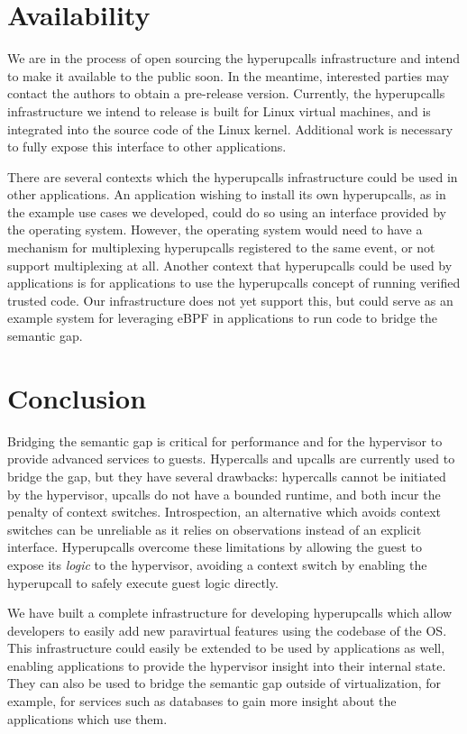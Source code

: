 \documentclass[11pt]{article}
\newcommand{\Hypercallback}{Hyperupcall\xspace{}}
\newcommand{\hypercallback}{hyperupcall\xspace{}}
\begin{document}
\section{Availability}
\label{sec:availability}

We are in the process of open sourcing the hyperupcalls infrastructure and intend to make it available to the public soon. 
In the meantime, interested parties may contact the authors to obtain a pre-release version. Currently, the hyperupcalls
infrastructure we intend to release is built for Linux virtual machines, and is integrated into the source code of the
Linux kernel. Additional work is necessary to fully expose this interface to other applications.

There are several contexts which the hyperupcalls infrastructure could be used in other applications. An application wishing
to install its own hyperupcalls, as in the example use cases we developed, could do so using an interface provided 
by the operating system. However, the operating system would need to have a mechanism for multiplexing hyperupcalls
registered to the same event, or not support multiplexing at all. Another context that hyperupcalls could be used
by applications is for applications to use the hyperupcalls concept of running verified trusted code. Our infrastructure
does not yet support this, but could serve as an example system for leveraging eBPF in applications to run code to 
bridge the semantic gap.

\section{Conclusion}
\label{sec:conclusion}

Bridging the semantic gap is critical for performance and for the hypervisor to
provide advanced services to guests. Hypercalls and upcalls are currently used to
bridge the gap, but they have several drawbacks: hypercalls cannot be initiated 
by the hypervisor, upcalls do not have a bounded runtime, and both incur the
penalty of context switches. Introspection,
an alternative which avoids context switches can be unreliable as it relies on
observations instead of an explicit interface. \Hypercallback{}s overcome 
these limitations by allowing the guest to expose its \emph{logic} to the hypervisor,
avoiding a context switch by enabling the \hypercallback{} to safely execute guest
logic directly.


We have built a complete infrastructure for developing \hypercallback{}s which
allow developers to easily add new paravirtual features using the codebase of the OS. This
infrastructure could easily be extended to be used by applications as well, enabling
applications to provide the hypervisor insight into their internal state. They can also be 
used to bridge the semantic gap outside of virtualization, for example, for services such
as databases to gain more insight about the applications which use them.
\end{document}
